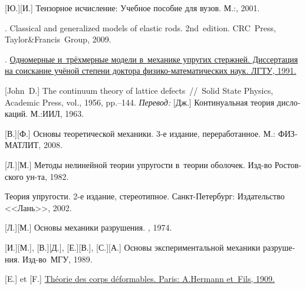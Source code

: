 \begin{thebibliography}{123}
\begin{otherlanguage}{russian}
[Ю.][И.]
Тензорное исчисление: Учебное пособие для вузов.
М.:\;, 2001.

.
Classical and generalized models of elastic rods.
2nd~edition.
CRC~Press, Taylor\:\&\:Francis~Group,
2009.

.
\href{https://www.researchgate.net/publication/320895320_Odnomernye_i_trehmernye_modeli_v_mehanike_uprugih_sterznej}%
{Одномерные и~трёхмерные модели в~механике упругих стержней.
Диссертация
на соискание
учёной степени
доктора
физико-математических наук.
ЛГТУ, 1991.}

[John~D.]
The continuum theory of lattice defects~//~Solid State Physics,
Academic Press,
vol., 1956,
pp.\hbox{--}144.
\emph{Перевод:}
[Дж.]
Континуальная теория дислокаций.
М.:\;ИИЛ,
1963.

[В.][Ф.]
Основы теоретической механики.
3-е издание, переработанное.
М.: ФИЗМАТЛИТ,
2008.

[Л.][М.]
Методы нелинейной теории упругости в~теории оболочек.
Изд\hbox{-}во Ростовского ун\hbox{-}та, 1982.

Теория упругости.
2-е издание, стереотипное.
{Санкт-Петербург}:
Издательство <<Лань>>, 2002.

[Л.][М.]
Основы механики разрушения.
\naukapublisher,
1974.

[И.][М.],
[В.][Д.],
[Е.][В.],
[С.][А.]
Основы экспериментальной механики разрушения.
Изд\hbox{-}во~МГУ,
1989.

[E.] et [F.]
\href{
   https://jscholarship.library.jhu.edu/bitstream/handle/1774.2/34209/31151000327233.pdf
}{
   Théorie des corps déformables.
   Paris:
   A.\:Hermann et~Fils,
   1909.
}


\end{otherlanguage}
\end{thebibliography}
